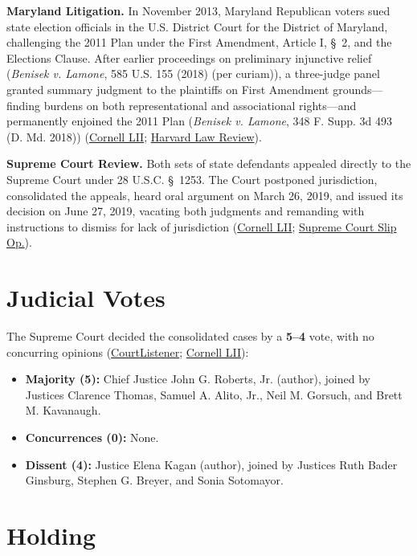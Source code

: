 \documentclass[12pt]{article}
\begin{document}
\textbf{Maryland Litigation.} In November 2013, Maryland Republican voters sued state election officials in the U.S. District Court for the District of Maryland, challenging the 2011 Plan under the First Amendment, Article I, \S~2, and the Elections Clause. After earlier proceedings on preliminary injunctive relief (\textit{Benisek v. Lamone}, 585 U.S. 155 (2018) (per curiam)), a three-judge panel granted summary judgment to the plaintiffs on First Amendment grounds---finding burdens on both representational and associational rights---and permanently enjoined the 2011 Plan (\textit{Benisek v. Lamone}, 348 F. Supp. 3d 493 (D. Md. 2018)) (\href{https://www.law.cornell.edu/supremecourt/text/18-422}{Cornell LII}; \href{https://harvardlawreview.org/print/vol-133/rucho-v-common-cause/}{Harvard Law Review}).

\textbf{Supreme Court Review.} Both sets of state defendants appealed directly to the Supreme Court under 28 U.S.C. \S~1253. The Court postponed jurisdiction, consolidated the appeals, heard oral argument on March 26, 2019, and issued its decision on June 27, 2019, vacating both judgments and remanding with instructions to dismiss for lack of jurisdiction (\href{https://www.law.cornell.edu/supremecourt/text/18-422}{Cornell LII}; \href{https://www.supremecourt.gov/opinions/18pdf/18-422_9ol1.pdf}{Supreme Court Slip Op.}).

\section{Judicial Votes}

The Supreme Court decided the consolidated cases by a \textbf{5--4} vote, with no concurring opinions (\href{https://www.courtlistener.com/opinion/4633469/rucho-v-common-cause/}{CourtListener}; \href{https://www.law.cornell.edu/supremecourt/text/18-422}{Cornell LII}):

\begin{itemize}
\item \textbf{Majority (5):} Chief Justice John G. Roberts, Jr. (author), joined by Justices Clarence Thomas, Samuel A. Alito, Jr., Neil M. Gorsuch, and Brett M. Kavanaugh.
\item \textbf{Concurrences (0):} None.
\item \textbf{Dissent (4):} Justice Elena Kagan (author), joined by Justices Ruth Bader Ginsburg, Stephen G. Breyer, and Sonia Sotomayor.
\end{itemize}

\section{Holding}
\end{document}
